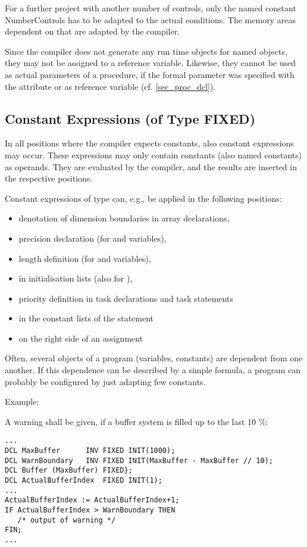 For a further project with another number of controls, only the named
constant NumberControls has to be adapted to the actual conditions. The
memory areas dependent on that are adapted by the compiler.

Since the compiler does not generate any run time objects for named
objects, they may not be assigned to a reference variable. Likewise,
they cannot be used as actual parameters of a procedure, if the formal
parameter was specified with the   attribute or as reference
variable (cf. \ref{sec_proc_dcl}).

\subsection{Constant Expressions (of Type FIXED)}   %
\label{sec_const_expression}

In all positions where the compiler expects constants, also constant
expressions may occur. These expressions may only contain constants
(also named constants) as operands. They are evaluated by the compiler,
and the results are inserted in the respective positions.

\begin{grammarframe}




\end{grammarframe}



Constant expressions of type  can, e.g., be applied in the
following positions:
\begin{itemize}
\item denotation of dimension boundaries in array declarations,
\item precision declaration (for  and  variables),
\item length definition (for  and  variables),
\item in initialisation lists (also for ),
\item priority definition in task declarations and task statements
\item in the constant lists of the  statement
\item on the right side of an assignment
\end{itemize}

Often, several objects of a program (variables, constants) are dependent
from one another. If this dependence can be described by a simple
formula, a program can probably be configured by just adapting few
constants.

Example:

A warning shall be given, if a buffer system is filled up to the last 10
\%:

\begin{lstlisting}
...
DCL MaxBuffer      INV FIXED INIT(1000); 
DCL WarnBoundary   INV FIXED INIT(MaxBuffer - MaxBuffer // 10);
DCL Buffer (MaxBuffer) FIXED};
DCL ActualBufferIndex  FIXED INIT(1);
... 
ActualBufferIndex := ActualBufferIndex+1;
IF ActualBufferIndex > WarnBoundary THEN 
   /* output of warning */ 
FIN;
...
\end{lstlisting}
